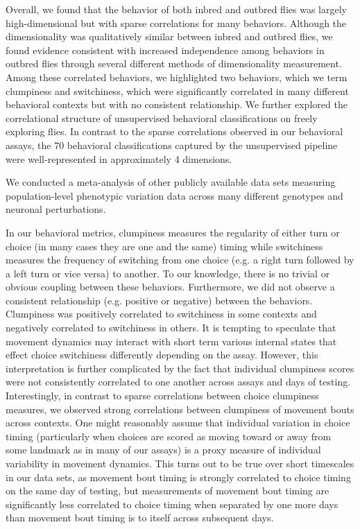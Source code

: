 \documentclass[12pt,letterpaper]{article}
\begin{document}
Overall, we found that the behavior of both inbred and outbred flies was largely high-dimensional but with sparse correlations for many behaviors. Although the dimensionality was qualitatively similar between inbred and outbred flies, we found evidence consistent with increased independence among behaviors in outbred flies through several different methods of dimensionality measurement. Among these correlated behaviors, we highlighted two behaviors, which we term clumpiness and switchiness, which were significantly correlated in many different behavioral contexts but with no consistent relationship. We further explored the correlational structure of unsupervised behavioral classifications on freely exploring flies. In contrast to the sparse correlations observed in our behavioral assays, the 70 behavioral classifications captured by the unsupervised pipeline were well-represented in approximately 4 dimensions. 

We conducted a meta-analysis of other publicly available data sets measuring population-level phenotypic variation data across many different genotypes and neuronal perturbations. 

In our behavioral metrics, clumpiness measures the regularity of either turn or choice (in many cases they are one and the same) timing while switchiness measures the frequency of switching from one choice (e.g. a right turn followed by a left turn or vice versa) to another. To our knowledge, there is no trivial or obvious coupling between these behaviors. Furthermore, we did not observe a consistent relationship (e.g. positive or negative) between the behaviors. Clumpiness was positively correlated to switchiness in some contexts and negatively correlated to switchiness in others. It is tempting to speculate that movement dynamics may interact with short term various internal states that effect choice switchiness differently depending on the assay. However, this interpretation is further complicated by the fact that individual clumpiness scores were not consistently correlated to one another across assays and days of testing. Interestingly, in contrast to sparse correlations between choice clumpiness measures, we observed strong correlations between clumpiness of movement bouts across contexts. One might reasonably assume that individual variation in choice timing (particularly when choices are scored as moving toward or away from some landmark as in many of our assays) is a proxy measure of individual variability in movement dynamics. This turns out to be true over short timescales in our data sets, as movement bout timing is strongly correlated to choice timing on the same day of testing, but measurements of movement bout timing are significantly less correlated to choice timing when separated by one more days than movement bout timing is to itself across subsequent days.
\end{document}
